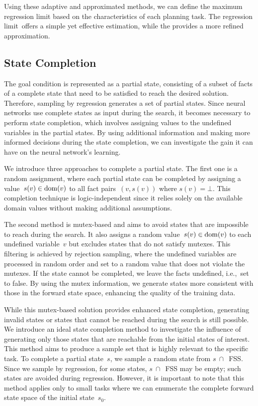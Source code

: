 Using these adaptive and approximated methods, we can define the maximum regression limit based on the characteristics of each planning task. The regression limit~\facts offers a simple yet effective estimation, while the \meanfx provides a more refined approximation.

\subsection{State Completion}
\label{sec:state-completion}

The goal condition is represented as a partial state, consisting of a subset of facts of a complete state that need to be satisfied to reach the desired solution. Therefore, sampling by regression generates a set of partial states. Since neural networks use complete states as input during the search, it becomes necessary to perform state completion, which involves assigning values to the undefined variables in the partial states. By using additional information and making more informed decisions during the state completion, we can investigate the gain it can have on the neural network's learning.

We introduce three approaches to complete a partial state. The first one is a random assignment, where each partial state can be completed by assigning a value~$s(v) \in \operatorname{dom}(v)$ to all fact pairs~$(v,s(v))$ where $s(v)=\bot$. This completion technique is logic-independent since it relies solely on the available domain values without making additional assumptions.

The second method is mutex-based and aims to avoid states that are impossible to reach during the search. It also assigns a random value~$s(v) \in \operatorname{dom}(v)$ to each undefined variable~$v$ but excludes states that do not satisfy mutexes. This filtering is achieved by rejection sampling, where the undefined variables are processed in random order and set to a random value that does not violate the mutexes. If the state cannot be completed, we leave the facts undefined, i.e.,~set to false. By using the mutex information, we generate states more consistent with those in the forward state space, enhancing the quality of the training data.

While this mutex-based solution provides enhanced state completion, generating invalid states or states that cannot be reached during the search is still possible. We introduce an ideal state completion method to investigate the influence of generating only those states that are reachable from the initial states of interest. This method aims to produce a sample set that is highly relevant to the specific task. To complete a partial state~$s$, we sample a random state from $s~\cap$~FSS. Since we sample by regression, for some states, $s~\cap$~FSS may be empty; such states are avoided during regression. However, it is important to note that this method applies only to small tasks where we can enumerate the complete forward state space of the initial state~$s_0$.

